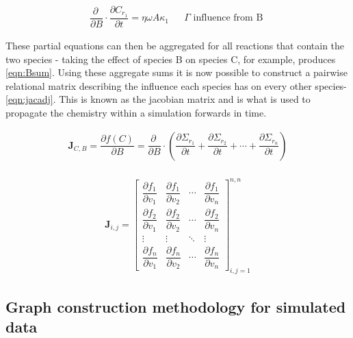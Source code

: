 \begin{eqnarray} 
   \dfrac{\partial \ }{\partial B}\cdot \dfrac{\partial C_{r_1}}{\partial t} = \eta \omega A \kappa_1 & &  \Gamma \text{ influence from B }\label{eqn:B}%
\end{eqnarray}
      
These partial equations can then be aggregated for all reactions that contain the two species - taking the effect of species B on species C, for example, produces \autoref{eqn:Bsum}. Using these aggregate sums it is now possible to construct a pairwise relational matrix describing the influence each species has on every other species- \autoref{eqn:jacadj}. This is known as the jacobian matrix and is what is used to propagate the chemistry within a simulation forwards in time. 
 
               
\begin{eqnarray}
   \mathbf{J}_{C,B} = \dfrac{\partial f(C) }{\partial B} =
\dfrac{\partial \ }{\partial B} \cdot \left( \dfrac{\partial \Sigma_{r_1}}{\partial t} + \dfrac{\partial \Sigma_{r_2}}{\partial t} + \cdots +\dfrac{\partial \Sigma_{r_n}}{\partial t} \right)
\label{eqn:Bsum}
\end{eqnarray}\\

\begin{eqnarray}
 \mathbf{J}_{i,j} =
 \begin{bmatrix}
   \dfrac{\partial f_1}{\partial v_1} &
     \dfrac{\partial f_1}{\partial v_2} &
     \cdots &
     \dfrac{\partial f_1}{\partial v_n} \\[13pt]
   \dfrac{\partial f_2}{\partial v_1} &
     \dfrac{\partial f_2}{\partial v_2} &
       \cdots &
     \dfrac{\partial f_2}{\partial v_n} \\[13pt]
       \vdots &
     \vdots & \ddots
        &
     \vdots\\[13pt]
   \dfrac{\partial f_n}{\partial v_1} &
     \dfrac{\partial f_n}{\partial v_2} &
       \cdots &
     \dfrac{\partial f_n}{\partial v_n}
 \end{bmatrix}_{i,j=1}^{n,n}
 \label{eqn:jacadj}
\end{eqnarray}



\subsection{Graph construction methodology for simulated data}\label{sec:graphconstruction}

